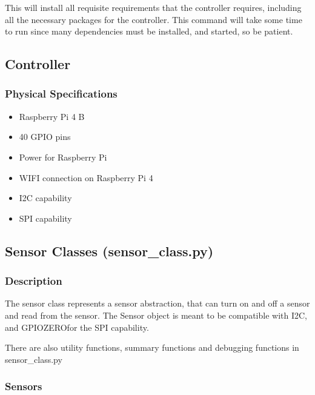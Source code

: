 \documentclass[
]{article}
\providecommand{\tightlist}{%
  \setlength{\itemsep}{0pt}\setlength{\parskip}{0pt}}
\begin{document}
This will install all requisite requirements that the controller
requires, including all the necessary packages for the controller. This
command will take some time to run since many dependencies must be
installed, and started, so be patient.

\hypertarget{controller}{%
\subsection{Controller}\label{controller}}

\hypertarget{physical-specifications}{%
\subsubsection{Physical Specifications}\label{physical-specifications}}

\begin{itemize}
\tightlist
\item
  Raspberry Pi 4 B
\item
  40 GPIO pins
\item
  Power for Raspberry Pi
\item
  WIFI connection on Raspberry Pi 4
\item
  I2C capability
\item
  SPI capability
\end{itemize}

\hypertarget{sensor-classes-sensor_class.py}{%
\subsection{Sensor Classes
(sensor\_class.py)}\label{sensor-classes-sensor_class.py}}

\hypertarget{description}{%
\subsubsection{Description}\label{description}}

The sensor class represents a sensor abstraction, that can turn on and
off a sensor and read from the sensor. The Sensor object is meant to be
compatible with I2C, and GPIOZEROfor the SPI capability.

There are also utility functions, summary functions and debugging
functions in sensor\_class.py

\hypertarget{sensors}{%
\subsubsection{Sensors}\label{sensors}}
\end{document}
